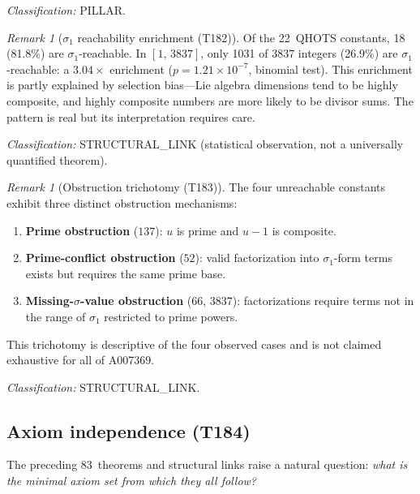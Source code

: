 \documentclass[aps,prd,twocolumn,superscriptaddress,floatfix,nofootinbib]{revtex4-2}
\theoremstyle{definition}
\theoremstyle{remark}
\newtheorem{remark}[theorem]{Remark}
\begin{document}
\noindent\textit{Classification:} PILLAR\@.

\begin{remark}[$\sigma_1$ reachability enrichment (T182)]
\label{rem:sigma-enrichment}
Of the 22~QHOTS constants, 18 (81.8\%) are $\sigma_1$-reachable.
In $[1,\,3837]$, only 1031 of 3837 integers (26.9\%) are
$\sigma_1$-reachable: a $3.04{\times}$ enrichment ($p = 1.21 \times
10^{-7}$, binomial test).  This enrichment is partly explained by
selection bias---Lie algebra dimensions tend to be highly composite,
and highly composite numbers are more likely to be divisor sums.
The pattern is real but its interpretation requires care.

\noindent\textit{Classification:} STRUCTURAL\_LINK (statistical
observation, not a universally quantified theorem).
\end{remark}

\begin{remark}[Obstruction trichotomy (T183)]
\label{rem:obstruction-trichotomy}
The four unreachable constants exhibit three distinct obstruction
mechanisms:
\begin{enumerate}[nosep]
  \item \textbf{Prime obstruction} ($137$): $u$ is prime and
    $u{-}1$ is composite.
  \item \textbf{Prime-conflict obstruction} ($52$): valid factorization
    into $\sigma_1$-form terms exists but requires the same prime base.
  \item \textbf{Missing-$\sigma$-value obstruction} ($66$, $3837$):
    factorizations require terms not in the range of $\sigma_1$
    restricted to prime powers.
\end{enumerate}
This trichotomy is descriptive of the four observed cases and is not
claimed exhaustive for all of A007369.

\noindent\textit{Classification:} STRUCTURAL\_LINK\@.
\end{remark}

\subsection{Axiom independence (T184)}
\label{sec:axiom-independence}

The preceding 83~theorems and structural links raise a natural question:
\emph{what is the minimal axiom set from which they all follow?}
\end{document}
